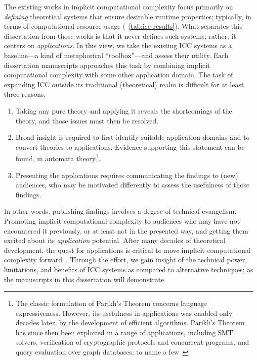 The existing works in implicit computational complexity focus primarily on \emph{defining} theoretical systems that ensure desirable runtime properties;
typically, in terms of computational resource usage (\cf~\autoref{tab:icc-results}).
What separates this dissertation from those works is that it never defines such systems;
rather, it centers on \emph{applications}.
In this view, we take the existing ICC systems as a baseline---a kind of metaphorical \enquote{toolbox}---and assess their utility.
Each dissertation manuscripts approaches this task by combining implicit computational complexity with some other application domain.
The task of expanding ICC outside its traditional (theoretical) realm is difficult for at least three reasons.

\begin{enumerate}

\item Taking any pure theory and applying it reveals the shortcomings of the theory, and those issues must then be resolved.

\item Broad insight is required to first identify suitable application domains and to convert theories to applications.
Evidence supporting this statement can be found, \eg in automata theory\footnote{
The classic formulation of Parikh's Theorem concerns language expressiveness.
However, its usefulness in applications was enabled {only decades later}, by the development of efficient algorithms.
Parikh's Theorem has since then been exploited in a range of applications, including SMT solvers, verification of cryptographic protocols and concurrent programs, and query evaluation over graph databases, to name a few~\cite[pg. 2]{hague2024}}.

\item Presenting the applications requires communicating the findings to (new) audiences, who may be motivated differently to assess the {usefulness} of those findings.
\end{enumerate}

In other words, publishing findings involves a degree of technical evangelism.
Promoting implicit computational complexity to audiences who may have not encountered it previously, or at least not in the presented way, and getting them excited about its \emph{application} potential.
After many decades of theoretical development, the quest for applications is critical to move implicit computational complexity forward~\cite[p.~7]{moyen2017}.
Through the effort, we gain insight of the technical power, limitations, and benefits of ICC systems as compared to alternative techniques;
as the manuscripts in this dissertation will demonstrate.

